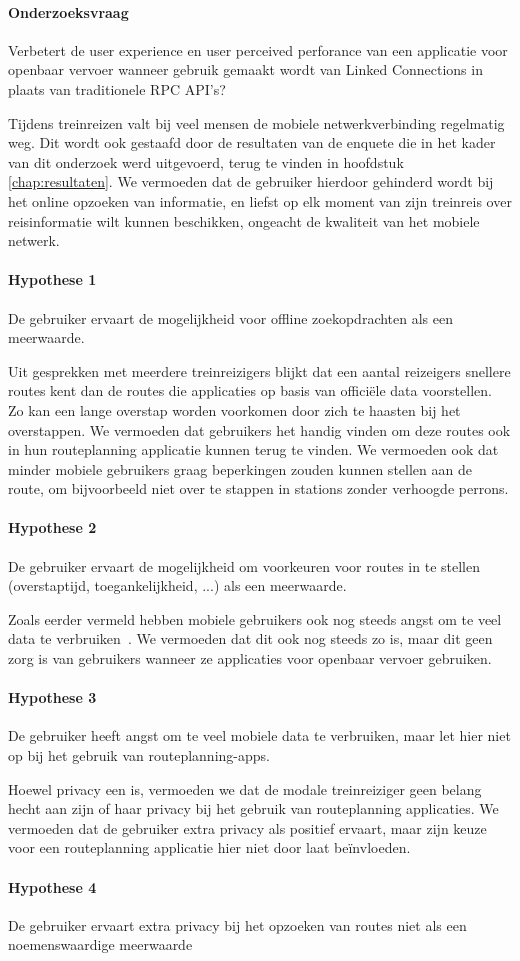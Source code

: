  \paragraph{Onderzoeksvraag} Verbetert de user experience en user perceived perforance van een applicatie voor openbaar vervoer wanneer gebruik gemaakt wordt van Linked Connections in plaats van traditionele RPC API's?
 
Tijdens treinreizen valt bij veel mensen de mobiele netwerkverbinding regelmatig weg. Dit wordt ook gestaafd door de resultaten van de enquete die in het kader van dit onderzoek werd uitgevoerd, terug te vinden in hoofdstuk \ref{chap:resultaten}. We vermoeden dat de gebruiker hierdoor gehinderd wordt bij het online opzoeken van informatie, en liefst op elk moment van zijn treinreis over reisinformatie wilt kunnen beschikken, ongeacht de kwaliteit van het mobiele netwerk.
 \paragraph{Hypothese 1} De gebruiker ervaart de mogelijkheid voor offline zoekopdrachten als een meerwaarde.
 
Uit gesprekken met meerdere treinreizigers blijkt dat een aantal reizeigers snellere routes kent dan de routes die applicaties op basis van officiële data voorstellen. Zo kan een lange overstap worden voorkomen door zich te haasten bij het overstappen. We vermoeden dat gebruikers het handig vinden om deze routes ook in hun routeplanning applicatie kunnen terug te vinden. We vermoeden ook dat minder mobiele gebruikers graag beperkingen zouden kunnen stellen aan de route, om bijvoorbeeld niet over te stappen in stations zonder verhoogde perrons.
 \paragraph{Hypothese 2} De gebruiker ervaart de mogelijkheid om voorkeuren voor routes in te stellen (overstaptijd, toegankelijkheid, ...) als een meerwaarde.
 
 Zoals eerder vermeld hebben mobiele gebruikers ook nog steeds angst om te veel data te verbruiken~\citep{ammelrooy17}. We vermoeden dat dit ook nog steeds zo is, maar dit geen zorg is van gebruikers wanneer ze applicaties voor openbaar vervoer gebruiken.
 \paragraph{Hypothese 3} De gebruiker heeft angst om te veel mobiele data te verbruiken, maar let hier niet op bij het gebruik van routeplanning-apps.
 
 Hoewel privacy een  is, vermoeden we dat de modale treinreiziger geen belang hecht aan zijn of haar privacy bij het gebruik van routeplanning applicaties. We vermoeden dat de gebruiker extra privacy als positief ervaart, maar zijn keuze voor een routeplanning applicatie hier niet door laat beïnvloeden.
 \paragraph{Hypothese 4} De gebruiker ervaart extra privacy bij het opzoeken van routes niet als een noemenswaardige meerwaarde
